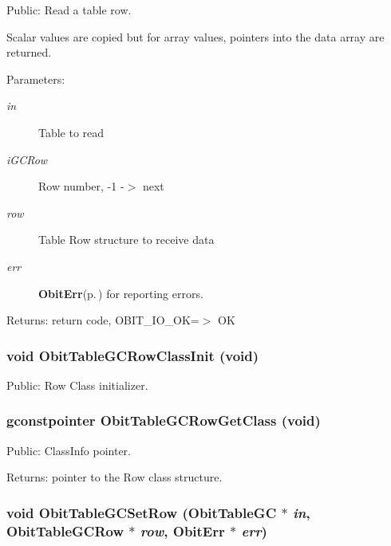 Public: Read a table row. 

Scalar values are copied but for array values, pointers into the data array are returned. \begin{Desc}
\item[Parameters:]
\begin{description}
\item[{\em in}]Table to read \item[{\em i\-GCRow}]Row number, -1 -$>$ next \item[{\em row}]Table Row structure to receive data \item[{\em err}]{\bf Obit\-Err}{\rm (p.\,\pageref{structObitErr})} for reporting errors. \end{description}
\end{Desc}
\begin{Desc}
\item[Returns:]return code, OBIT\_\-IO\_\-OK=$>$ OK \end{Desc}
\subsubsection{\setlength{\rightskip}{0pt plus 5cm}void Obit\-Table\-GCRow\-Class\-Init (void)}\label{ObitTableGC_8h_a7}


Public: Row Class initializer. 

\subsubsection{\setlength{\rightskip}{0pt plus 5cm}gconstpointer Obit\-Table\-GCRow\-Get\-Class (void)}\label{ObitTableGC_8h_a9}


Public: Class\-Info pointer. 

\begin{Desc}
\item[Returns:]pointer to the Row class structure. \end{Desc}
\subsubsection{\setlength{\rightskip}{0pt plus 5cm}void Obit\-Table\-GCSet\-Row ({\bf Obit\-Table\-GC} $\ast$ {\em in}, {\bf Obit\-Table\-GCRow} $\ast$ {\em row}, {\bf Obit\-Err} $\ast$ {\em err})}\label{ObitTableGC_8h_a19}


